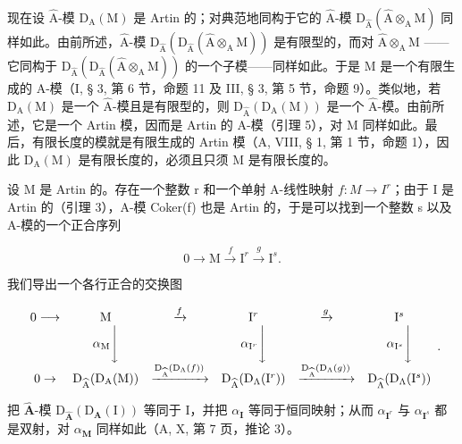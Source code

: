 现在设 \(\widehat{\mathrm{A}}\)-模 \(\mathrm{D}_{\mathrm{A}}(\mathrm{M})\) 是 Artin 的；对典范地同构于它的 \(\widehat{\mathrm{A}}\)-模 \(\mathrm{D}_{\widehat{\mathrm{A}}}(\widehat{\mathrm{A}} \otimes_{\mathrm{A}} \mathrm{M})\) 同样如此。由前所述，\(\widehat{\mathrm{A}}\)-模 \(\mathrm{D}_{\widehat{\mathrm{A}}}(\mathrm{D}_{\widehat{\mathrm{A}}}(\widehat{\mathrm{A}} \otimes_{\mathrm{A}} \mathrm{M}))\) 是有限型的，而对 \(\widehat{\mathrm{A}} \otimes_{\mathrm{A}} \mathrm{M}\) ——它同构于 \(\mathrm{D}_{\widehat{\mathrm{A}}}(\mathrm{D}_{\widehat{\mathrm{A}}}(\widehat{\mathrm{A}} \otimes_{\mathrm{A}} \mathrm{M}))\) 的一个子模——同样如此。于是 M 是一个有限生成的 A-模（I, § 3, 第 6 节，命题 11 及 III, § 3, 第 5 节，命题 9）。类似地，若 \(\mathrm{D}_{\mathrm{A}}(\mathrm{M})\) 是一个 \(\widehat{\mathrm{A}}\)-模且是有限型的，则 \(\mathrm{D}_{\widehat{\mathrm{A}}}(\mathrm{D}_{\mathrm{A}}(\mathrm{M}))\) 是一个 \(\widehat{\mathrm{A}}\)-模。由前所述，它是一个 Artin 模，因而是 Artin 的 A-模（引理 5），对 M 同样如此。最后，有限长度的模就是有限生成的 Artin 模（A, VIII, § 1, 第 1 节，命题 1），因此 \(\mathrm{D}_{\mathrm{A}}(\mathrm{M})\) 是有限长度的，必须且只须 M 是有限长度的。

设 M 是 Artin 的。存在一个整数 r 和一个单射 A-线性映射 \(f : M \to I^{r}\)；由于 I 是 Artin 的（引理 3），A-模 Coker(f) 也是 Artin 的，于是可以找到一个整数 s 以及 A-模的一个正合序列

\[
0 \to \mathrm{M} \stackrel {f} {\longrightarrow} \mathrm{I} ^ {r} \stackrel {g} {\longrightarrow} \mathrm{I} ^ {s}.
\]

我们导出一个各行正合的交换图

\[
\begin{array}{c c c c c c} 0 \longrightarrow & \mathrm{M} & \xrightarrow {f} & \mathrm{I} ^ {r} & \xrightarrow {g} & \mathrm{I} ^ {s} \\ & \alpha_ {\mathrm{M}} \Biggl \downarrow & & \alpha_ {\mathrm{I} ^ {r}} \Biggl \downarrow & & \alpha_ {\mathrm{I} ^ {s}} \Biggl \downarrow \\ 0 \to & \mathrm{D} _ {\widehat {\mathrm{A}}} (\mathrm{D} _ {\mathrm{A}} (\mathrm{M})) & \xrightarrow {\mathrm{D} _ {\widehat {\mathrm{A}}} (\mathrm{D} _ {\Lambda} (f))} & \mathrm{D} _ {\widehat {\mathrm{A}}} (\mathrm{D} _ {\Lambda} (\mathrm{I} ^ {r})) & \xrightarrow {\mathrm{D} _ {\widehat {\mathrm{A}}} (\mathrm{D} _ {\Lambda} (g))} & \mathrm{D} _ {\widehat {\Lambda}} (\mathrm{D} _ {\Lambda} (\mathrm{I} ^ {s})) \end{array} .
\]

把 \(\widehat{\mathbf{A}}\)-模 \(\mathrm{D}_{\widehat{\mathbf{A}}}(\mathrm{D}_{\mathbf{A}}(\mathrm{I}))\) 等同于 I，并把 \(\alpha_{\mathbf{I}}\) 等同于恒同映射；从而 \(\alpha_{\mathbf{I}^r}\) 与 \(\alpha_{\mathbf{I}^s}\) 都是双射，对 \(\alpha_{\mathbf{M}}\) 同样如此（A, X, 第 7 页，推论 3）。

